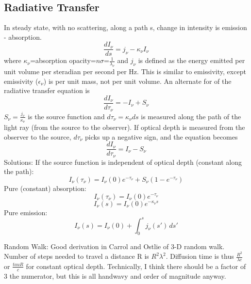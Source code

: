 \subsection{Radiative Transfer}
In steady state, with no scattering, along a path s, change in intensity is emission - absorption.
\begin{displaymath}\frac{dI_{\nu}}{ds}=j_{\nu}-\kappa_{\nu}I_{\nu}\end{displaymath}
where $\kappa_{\nu}$=absorption opacity=$n\sigma$=$\frac{1}{\lambda_{\nu}}$ and $j_{\nu}$ is 
defined as the energy emitted per unit volume per steradian per second per Hz.  This is similar 
to emissivity, except emissivity ($\epsilon_{\nu}$) is per unit mass, not per unit volume.
An alternate for of the radiative transfer equation is 
\begin{displaymath}\frac{dI_{\nu}}{d\tau_{\nu}}=-I_{\nu}+S_{\nu}\end{displaymath}
$S_{\nu}=\frac{j_{\nu}}{\kappa_{\nu}}$ is the source function and $d\tau_{\nu}=\kappa_{\nu}ds$ 
is measured along the path of the light ray (from the source to the observer).  If optical depth 
is measured from the observer to the source, $d\tau_{\nu}$ picks up a negative sign, and the 
equation becomes
\begin{displaymath}\frac{dI_{\nu}}{d\tau_{\nu}}=I_{\nu}-S_{\nu}\end{displaymath}
Solutions:\newline
If the source function is independent of optical depth (constant along the path):\newline
\begin{displaymath}I_{\nu}(\tau_{\nu})=I_{\nu}(0)e^{-\tau_{\nu}}+S_{\nu}(1-e^{-\tau_{\nu}})\end{displaymath}
Pure (constant) absorption:\newline
\begin{displaymath}I_{\nu}(\tau_{\nu})=I_{\nu}(0)e^{-\tau_{\nu}}\end{displaymath}
\begin{displaymath}I_{\nu}(s)=I_{\nu}(0)e^{-\kappa_{\nu} s}\end{displaymath}
Pure emission:\newline
\begin{displaymath}I_{\nu}(s)=I_{\nu}(0)+\int_0^s j_{\nu}(s')\,ds'\end{displaymath}

Random Walk:\newline
Good derivation in Carrol and Ostlie of 3-D random walk.  Number of steps needed to travel a 
distance R is $R^2\lambda^2$.  Diffusion time is thus $\frac{R^2}{\lambda c}$ or $\frac{tau R}{c}$ 
for constant optical depth.  Technically, I think there should be a factor of 3 the numerator, 
but this is all handwavy and order of magnitude anyway.

